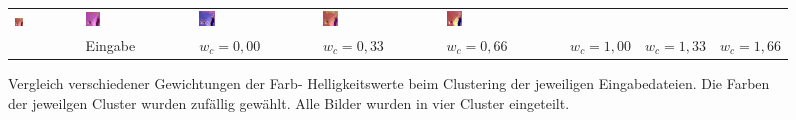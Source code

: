 \begin{figure}[h!]
\begin{tabular}{m{15pt}m{}m{}m{}m{}m{}m{}m{}}
		\includegraphics[width=0.14\textwidth]{images/gen/color_weight/p03_04.png_0.33.png} &
		\includegraphics[width=0.14\textwidth]{images/gen/color_weight/p03_04.png_0.66.png} &
		\includegraphics[width=0.14\textwidth]{images/gen/color_weight/p03_04.png_1.00.png} &
		\includegraphics[width=0.14\textwidth]{images/gen/color_weight/p03_04.png_1.33.png} &
		\includegraphics[width=0.14\textwidth]{images/gen/color_weight/p03_04.png_1.66.png} \\
		
		&
		\vspace*{2pt}\centering Eingabe & 
		\vspace*{2pt}\centering $w_c=0,00$ &
		\vspace*{2pt}\centering $w_c=0,33$ &
		\vspace*{2pt}\centering $w_c=0,66$ &
		\vspace*{2pt}\centering $w_c=1,00$ &
		\vspace*{2pt}\centering $w_c=1,33$ &
		\vspace*{2pt}\centering $w_c=1,66$
	\end{tabular}
	\caption{Vergleich verschiedener Gewichtungen der Farb- \bzw Helligkeitswerte beim Clustering der jeweiligen Eingabedateien. Die Farben der jeweilgen Cluster wurden zufällig gewählt. Alle Bilder wurden in vier Cluster eingeteilt.}
	\label{fig:filterbank_weights_col}
\end{figure}

